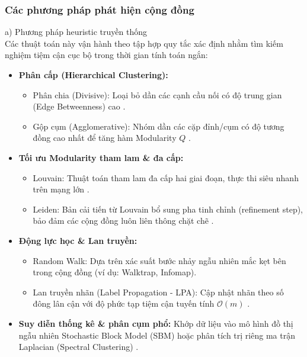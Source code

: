\documentclass[14pt,a4paper]{extarticle}
\begin{document}
\subsubsection{Các phương pháp phát hiện cộng đồng}

\noindent a) Phương pháp heuristic truyền thống \\
Các thuật toán này vận hành theo tập hợp quy tắc xác định nhằm tìm kiếm nghiệm tiệm cận cục bộ trong thời gian tính toán ngắn:
\begin{itemize}
    \item \textbf{Phân cấp (Hierarchical Clustering):}
    \begin{itemize}
        \item Phân chia (Divisive): Loại bỏ dần các cạnh cầu nối có độ trung gian (Edge Betweenness) cao \cite{Bedi2016}.
        \item Gộp cụm (Agglomerative): Nhóm dần các cặp đỉnh/cụm có độ tương đồng cao nhất để tăng hàm Modularity $Q$ \cite{Traag2014}.
    \end{itemize}
    
    \item \textbf{Tối ưu Modularity tham lam \& đa cấp:}
    \begin{itemize}
        \item Louvain: Thuật toán tham lam đa cấp hai giai đoạn, thực thi siêu nhanh trên mạng lớn \cite{Baraa2021}.
        \item Leiden: Bản cải tiến từ Louvain bổ sung pha tinh chỉnh (refinement step), bảo đảm các cộng đồng luôn liên thông chặt chẽ \cite{Pourabbasi2022}.
    \end{itemize}
    
    \item \textbf{Động lực học \& Lan truyền:}
    \begin{itemize}
        \item Random Walk: Dựa trên xác suất bước nhảy ngẫu nhiên mắc kẹt bên trong cộng đồng (ví dụ: Walktrap, Infomap).
        \item Lan truyền nhãn (Label Propagation - LPA): Cập nhật nhãn theo số đông lân cận với độ phức tạp tiệm cận tuyến tính $\mathcal{O}(m)$ \cite{Gong2016}.
    \end{itemize}
    
    \item \textbf{Suy diễn thống kê \& phân cụm phổ:} Khớp dữ liệu vào mô hình đồ thị ngẫu nhiên Stochastic Block Model (SBM) \cite{Baraa2021} hoặc phân tích trị riêng ma trận Laplacian (Spectral Clustering) \cite{Chen2019}.
\end{itemize}
\end{document}

